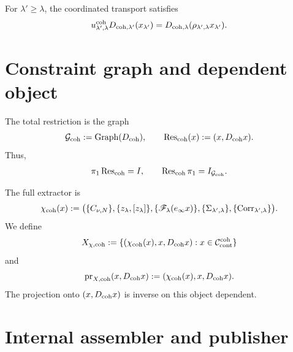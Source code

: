 For \(\lambda'\geq\lambda\), the coordinated transport satisfies
\begin{equation}\label{eq:pdfv2-coh-d-naturality}
 u_{\lambda',\lambda}^{\rm coh}
 D_{{\rm coh},\lambda'}(x_{\lambda'})
 =D_{{\rm coh},\lambda}
  (\rho_{\lambda',\lambda}x_{\lambda'}).
\end{equation}

\section{Constraint graph and dependent object}
\label{sec:pdfv2-coh-graphs}

The total restriction is the graph
\begin{equation}\label{eq:pdfv2-coh-g-graph}
 \mathcal G_{\rm coh}:=\operatorname{Graph}(D_{\rm coh}),
 \qquad
 \operatorname{Res}_{\rm coh}(x):=(x,D_{\rm coh}x).
\end{equation}
Thus,
\begin{equation}\label{eq:pdfv2-coh-res-inverse}
 \pi_1\operatorname{Res}_{\rm coh}=I,
 \qquad
 \operatorname{Res}_{\rm coh}\pi_1=I_{\mathcal G_{\rm coh}}.
\end{equation}

The full extractor is
\begin{equation}\label{eq:pdfv2-coh-chi}
 \chi_{\rm coh}(x):=
 \bigl(
 \{C_{\nu,N}\},
 \{z_\lambda,[z_\lambda]\},
 \{\mathscr F_\lambda(e_\infty x)\},
 \{\Sigma_{\lambda',\lambda}\},
 \{\operatorname{Corr}_{\lambda',\lambda}\}
 \bigr).
\end{equation}
We define
\begin{equation}\label{eq:pdfv2-coh-xchi}
 X_{\chi,{\rm coh}}
 :=\{(\chi_{\rm coh}(x),x,D_{\rm coh}x):
 x\in\mathcal C_{\rm cont}^{\rm coh}\}
\end{equation}
and
\begin{equation}\label{eq:pdfv2-coh-prx}
 \operatorname{pr}_{X,{\rm coh}}(x,D_{\rm coh}x)
 :=(\chi_{\rm coh}(x),x,D_{\rm coh}x).
\end{equation}
The projection onto \((x,D_{\rm coh}x)\) is inverse on this object
dependent.

\section{Internal assembler and publisher}
\label{sec:pdfv2-coh-assembler-publisher}

